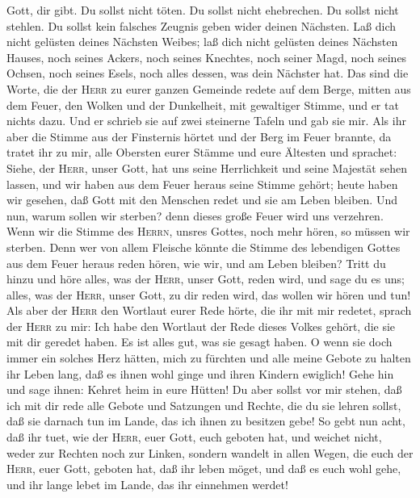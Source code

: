 Gott, dir gibt.  Du sollst nicht töten. 
Du sollst nicht ehebrechen.  Du sollst nicht stehlen.
 Du sollst kein falsches Zeugnis geben wider deinen
Nächsten.  Laß dich nicht gelüsten deines Nächsten
Weibes; laß dich nicht gelüsten deines Nächsten Hauses, noch seines
Ackers, noch seines Knechtes, noch seiner Magd, noch seines Ochsen, noch
seines Esels, noch alles dessen, was dein Nächster hat. 
Das sind die Worte, die der \textsc{Herr} zu eurer ganzen Gemeinde
redete auf dem Berge, mitten aus dem Feuer, den Wolken und der
Dunkelheit, mit gewaltiger Stimme, und er tat nichts dazu. Und er
schrieb sie auf zwei steinerne Tafeln und gab sie mir. 
Als ihr aber die Stimme aus der Finsternis hörtet und der Berg im Feuer
brannte, da tratet ihr zu mir, alle Obersten eurer Stämme und eure
Ältesten und sprachet:  Siehe, der \textsc{Herr}, unser
Gott, hat uns seine Herrlichkeit und seine Majestät sehen lassen, und
wir haben aus dem Feuer heraus seine Stimme gehört; heute haben wir
gesehen, daß Gott mit den Menschen redet und sie am Leben bleiben.
 Und nun, warum sollen wir sterben? denn dieses große
Feuer wird uns verzehren. Wenn wir die Stimme des \textsc{Herrn}, unsres
Gottes, noch mehr hören, so müssen wir sterben.  Denn wer
von allem Fleische könnte die Stimme des lebendigen Gottes aus dem Feuer
heraus reden hören, wie wir, und am Leben bleiben?  Tritt
du hinzu und höre alles, was der \textsc{Herr}, unser Gott, reden wird,
und sage du es uns; alles, was der \textsc{Herr}, unser Gott, zu dir
reden wird, das wollen wir hören und tun!  Als aber der
\textsc{Herr} den Wortlaut eurer Rede hörte, die ihr mit mir redetet,
sprach der \textsc{Herr} zu mir: Ich habe den Wortlaut der Rede dieses
Volkes gehört, die sie mit dir geredet haben. Es ist alles gut, was sie
gesagt haben.  O wenn sie doch immer ein solches Herz
hätten, mich zu fürchten und alle meine Gebote zu halten ihr Leben lang,
daß es ihnen wohl ginge und ihren Kindern ewiglich!  Gehe
hin und sage ihnen: Kehret heim in eure Hütten!  Du aber
sollst vor mir stehen, daß ich mit dir rede alle Gebote und Satzungen
und Rechte, die du sie lehren sollst, daß sie darnach tun im Lande, das
ich ihnen zu besitzen gebe!  So gebt nun acht, daß ihr
tuet, wie der \textsc{Herr}, euer Gott, euch geboten hat, und weichet
nicht, weder zur Rechten noch zur Linken,  sondern
wandelt in allen Wegen, die euch der \textsc{Herr}, euer Gott, geboten
hat, daß ihr leben möget, und daß es euch wohl gehe, und ihr lange lebet
im Lande, das ihr einnehmen werdet!

